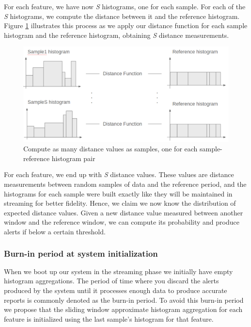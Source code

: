 For each feature, we have now \textit{S} histograms, one for each sample. For each of the \textit{S} histograms, we compute the distance between it and the reference histogram. Figure \ref{fig:compute-sample-distances} illustrates this process as we apply our distance function for each sample histogram and the reference histogram, obtaining \textit{S} distance measurements.

\begin{figure}[!htb]
    \begin{center}
      \includegraphics[scale=0.4]{figures/compute-sample-distances.png}
      \caption[Compute as many distance values as samples]{Compute as many distance values as samples, one for each sample-reference histogram pair}
      \label{fig:compute-sample-distances}
    \end{center}
\end{figure}

For each feature, we end up with \textit{S} distance values. These values are distance measurements between random samples of data and the reference period, and the histograms for each sample were built exactly like they will be maintained in streaming for better fidelity. Hence, we claim we now know the distribution of expected distance values. Given a new distance value measured between another window and the reference window, we can compute its probability and produce alerts if below a certain threshold.

\subsubsection*{Burn-in period at system initialization}
When we boot up our system in the streaming phase we initially have empty histogram aggregations. The period of time where you discard the alerts produced by the system until it processes enough data to produce accurate reports is commonly denoted as the burn-in period. To avoid this burn-in period we propose that the sliding window approximate histogram aggregation for each feature is initialized using the last sample's histogram for that feature.

